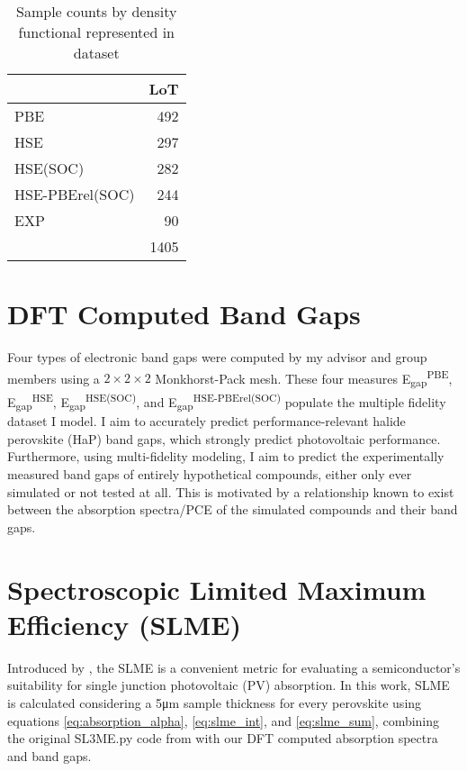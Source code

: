  
\begin{table}[htbp]
\caption{\label{tbl:LoTs} Sample counts by density functional represented in dataset}
\centering
\begin{tabular}{lr}
 & LoT\\[0pt]
\hline
PBE & 492\\[0pt]
HSE & 297\\[0pt]
HSE(SOC) & 282\\[0pt]
HSE-PBErel(SOC) & 244\\[0pt]
EXP & 90\\[0pt]
\hline
 & 1405\\[0pt]
\end{tabular}
\end{table}

\section{DFT Computed Band Gaps}
\label{sec:orge9d37b5}
Four types of electronic band gaps were computed by my advisor and group members using a \(2\times{}2\times{}2\) Monkhorst-Pack mesh.
These four measures E\textsubscript{gap}\textsuperscript{PBE}, E\textsubscript{gap}\textsuperscript{HSE}, E\textsubscript{gap}\textsuperscript{HSE(SOC)}, and E\textsubscript{gap}\textsuperscript{HSE-PBErel(SOC)} populate the multiple fidelity dataset I model.
I aim to accurately predict performance-relevant halide perovskite (HaP) band gaps, which strongly predict photovoltaic performance.
\autocite{mannodi-kanakkithodi-2019-compr-comput}
Furthermore, using multi-fidelity modeling, I aim to predict the experimentally measured band gaps of entirely hypothetical compounds, either only ever simulated or not tested at all.
This is motivated by a relationship known to exist between the absorption spectra/PCE of the simulated compounds and their band gaps.

\section{Spectroscopic Limited Maximum Efficiency (SLME)}
\label{sec:org9395ff5}
Introduced by \textcite{yu-2012-ident-poten}, the SLME is a convenient metric for evaluating a semiconductor's suitability for single junction photovoltaic (PV) absorption.
In this work, SLME is calculated considering a 5\unit{\micro\meter} sample thickness for every perovskite using equations \ref{eq:absorption_alpha}, \ref{eq:slme_int}, and \ref{eq:slme_sum}, combining the original SL3ME.py code from \textcite{yu-2012-ident-poten} with our DFT computed absorption spectra and band gaps.

